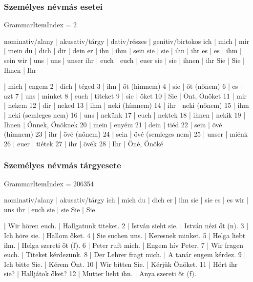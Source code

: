 \documentclass{article}
\newenvironment{desc}{\verbatim}{\endverbatim}
\newenvironment{exmp}{\verbatim}{\endverbatim}
\begin{document}
\subsubsection{Személyes névmás esetei}

GrammarItemIndex = 2

\begin{desc}
nominativ/alany | akusativ/tárgy | dativ/részes | genitiv/birtokos
ich             | mich           | mir          | mein
du              | dich           | dir          | dein 
er              | ihn            | ihm          | sein
sie             | sie            | ihn          | ihr
es              | es             | ihm          | sein
wir             | uns            | uns          | unser
ihr             | euch           | euch         | euer
sie             | sie            | ihnen        | ihr
Sie             | Sie            | Ihnen        | Ihr 
\end{desc}

\begin{exmp}
1 | mich | engem
2 | dich | téged
3 | ihn | őt (himnem)
4 | sie | őt (nőnem)
6 | es | azt
7 | uns | minket
8 | euch | titeket
9 | sie | őket
10 | Sie | Önt, Önöket
11 | mir | nekem
12 | dir | neked
13 | ihm | neki (hímnem)
14 | ihr | neki (nőnem)
15 | ihm | neki (semleges nem)
16 | uns | nekünk
17 | euch | nektek
18 | ihnen | nekik
19 | Ihnen | Önnek, Önöknek
20 | mein | enyém
21 | dein | tiéd
22 | sein | övé (hímnem)
23 | ihr | övé (nőnem)
24 | sein | övé (semleges nem)
25 | unser | miénk
26 | euer | tiétek
27 | ihr | övék
28 | Ihr | Öné, Önöké
\end{exmp}

\subsubsection{Személyes névmás tárgyesete}

GrammarItemIndex = 206354

\begin{desc}
nominativ/alany | akusativ/tárgy
ich             | mich
du              | dich
er              | ihn
sie             | sie
es              | es
wir             | uns
ihr             | euch
sie             | sie
Sie             | Sie
\end{desc}

\begin{exmp}
1 | Wir hören euch. | Hallgatunk titeket.
2 | István sieht sie. | István nézi őt (n).
3 | Ich höre sie. | Hallom őket.
4 | Sie suchen uns. | Keresnek minket.
5 | Helga liebt ihn. | Helga szereti őt (f).
6 | Peter ruft mich. | Engem hív Peter.
7 | Wir fragen euch. | Titeket kérdezünk.
8 | Der Lehrer fragt mich. | A tanár engem kérdez.
9 | Ich bitte Sie. | Kérem Önt.
10 | Wir bitten Sie. | Kérjük Önöket.
11 | Hört ihr sie? | Halljátok őket?
12 | Mutter liebt ihn. | Anya szereti őt (f).
\end{exmp}
\end{document}
